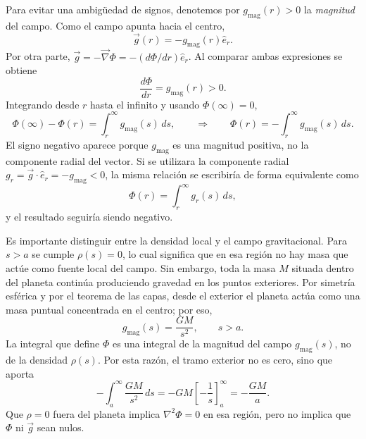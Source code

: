 \begin{enumerate}[a)]
    Para evitar una ambigüedad de signos, denotemos por $g_{\mathrm{mag}}(r)>0$ la \emph{magnitud} del campo. Como el campo apunta hacia el centro,
    $$
    \vec g(r)=-g_{\mathrm{mag}}(r)\hat e_r.
    $$
    Por otra parte, $\vec g=-\vec\nabla\Phi=-(d\Phi/dr)\hat e_r$. Al comparar ambas expresiones se obtiene
    $$
    \frac{d\Phi}{dr}=g_{\mathrm{mag}}(r)>0.
    $$
    Integrando desde $r$ hasta el infinito y usando $\Phi(\infty)=0$,
    $$
    \Phi(\infty)-\Phi(r)
    =\int_r^\infty g_{\mathrm{mag}}(s)\,ds,
    \qquad\Longrightarrow\qquad
    \Phi(r)=-\int_r^\infty g_{\mathrm{mag}}(s)\,ds.
    $$
    El signo negativo aparece porque $g_{\mathrm{mag}}$ es una magnitud positiva, no la componente radial del vector. Si se utilizara la componente radial $g_r=\vec g\cdot\hat e_r=-g_{\mathrm{mag}}<0$, la misma relación se escribiría de forma equivalente como
    $$
    \Phi(r)=\int_r^\infty g_r(s)\,ds,
    $$
    y el resultado seguiría siendo negativo.

    Es importante distinguir entre la densidad local y el campo gravitacional. Para $s>a$ se cumple $\rho(s)=0$, lo cual significa que en esa región no hay masa que actúe como fuente local del campo. Sin embargo, toda la masa $M$ situada dentro del planeta continúa produciendo gravedad en los puntos exteriores. Por simetría esférica y por el teorema de las capas, desde el exterior el planeta actúa como una masa puntual concentrada en el centro; por eso,
    $$
    g_{\mathrm{mag}}(s)=\frac{GM}{s^2}, \qquad s>a.
    $$
    La integral que define $\Phi$ es una integral de la magnitud del campo $g_{\mathrm{mag}}(s)$, no de la densidad $\rho(s)$. Por esta razón, el tramo exterior no es cero, sino que aporta
    $$
    -\int_a^\infty\frac{GM}{s^2}\,ds
    =-GM\left[-\frac{1}{s}\right]_a^\infty
    =-\frac{GM}{a}.
    $$
    Que $\rho=0$ fuera del planeta implica $\nabla^2\Phi=0$ en esa región, pero no implica que $\Phi$ ni $\vec g$ sean nulos.


\end{enumerate}
